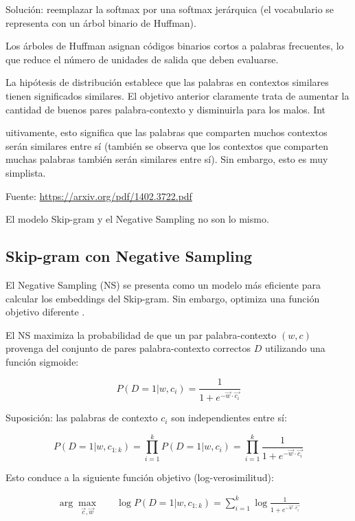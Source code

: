 Solución: reemplazar la softmax por una softmax jerárquica (el vocabulario se representa con un árbol binario de Huffman).

Los árboles de Huffman asignan códigos binarios cortos a palabras frecuentes, lo que reduce el número de unidades de salida que deben evaluarse.

La hipótesis de distribución establece que las palabras en contextos similares tienen significados similares. El objetivo anterior claramente trata de aumentar la cantidad de buenos pares palabra-contexto y disminuirla para los malos. Int

uitivamente, esto significa que las palabras que comparten muchos contextos serán similares entre sí (también se observa que los contextos que comparten muchas palabras también serán similares entre sí). Sin embargo, esto es muy simplista.

Fuente: \url{https://arxiv.org/pdf/1402.3722.pdf}

El modelo Skip-gram y el Negative Sampling no son lo mismo.

\subsection{Skip-gram con Negative Sampling}

El Negative Sampling (NS) se presenta como un modelo más eficiente para calcular los embeddings del Skip-gram.
Sin embargo, optimiza una función objetivo diferente \cite{goldberg2014word2vec}.

El NS maximiza la probabilidad de que un par palabra-contexto $(w, c)$ provenga del conjunto de pares palabra-contexto correctos $D$ utilizando una función sigmoide:

\begin{displaymath}
P(D = 1| w,c_i) = \frac{1}{1+e^{-\vec{w} \cdot \vec{c_{i}}}}
\end{displaymath}

Suposición: las palabras de contexto $c_i$ son independientes entre sí:

\begin{displaymath}
P(D = 1| w,c_{1:k}) = \prod_{i=1}^{k}{P(D = 1| w,c_i)} = \prod_{i=1}^{k}{\frac{1}{1+e^{-\vec{w} \cdot \vec{c_{i}}}}} 
\end{displaymath}

Esto conduce a la siguiente función objetivo (log-verosimilitud):

\begin{equation}
\begin{split}
\operatorname{arg} \max_{\vec{c}, \vec{w}} & \quad \log P(D = 1| w,c_{1:k}) = \sum_{i=1}^{k}{\log \frac{1}{1+e^{-\vec{w} \cdot \vec{c_{i}}}}}
\end{split}
\end{equation}


